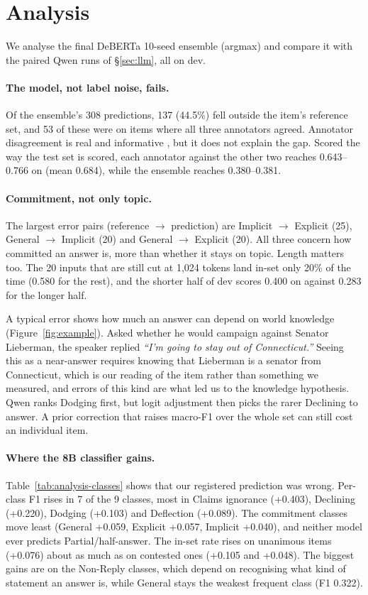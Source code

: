\section{Analysis}\label{sec:analysis}

We analyse the final DeBERTa 10-seed ensemble (argmax) and compare it with the paired
Qwen runs of \S\ref{sec:llm}, all on dev.

\paragraph{The model, not label noise, fails.}
Of the ensemble's 308 predictions, 137 (44.5\%) fell outside the item's reference set, and
53 of these were on items where all three annotators agreed. Annotator disagreement is real
and informative \citep{uma2021learning}, but it does not explain the gap. Scored the way
the test set is scored, each annotator against the other two reaches 0.643--0.766 on \Stwo{}
(mean 0.684), while the ensemble reaches 0.380--0.381.

\paragraph{Commitment, not only topic.}
The largest error pairs (reference $\rightarrow$ prediction) are Implicit $\rightarrow$
Explicit (25), General $\rightarrow$ Implicit (20) and General $\rightarrow$ Explicit (20).
All three concern how committed an answer is, more than whether it stays on topic. Length
matters too. The 20 inputs that are still cut at 1,024 tokens land in-set only 20\% of the
time (0.580 for the rest), and the shorter half of dev scores 0.400 on \Stwo{} against 0.283
for the longer half.

\FigureExample
A typical error shows how much an answer can depend on world knowledge
(Figure~\ref{fig:example}). Asked whether he would campaign against Senator Lieberman, the
speaker replied \emph{``I'm going to stay out of Connecticut.''} Seeing this as a near-answer
requires knowing that Lieberman is a senator from Connecticut, which is our reading of the
item rather than something we measured, and errors of this kind are what led us to the
knowledge hypothesis. Qwen ranks Dodging first, but logit adjustment then picks the rarer
Declining to answer. A prior correction that raises macro-F1 over the whole set can still
cost an individual item.

\paragraph{Where the 8B classifier gains.}
Table~\ref{tab:analysis-classes} shows that our registered prediction was wrong. Per-class
F1 rises in 7 of the 9 classes, most in Claims ignorance (+0.403), Declining (+0.220),
Dodging (+0.103) and Deflection (+0.089). The commitment classes move least (General +0.059,
Explicit +0.057, Implicit +0.040), and neither model ever predicts Partial/half-answer. The
in-set rate rises on unanimous items (+0.076) about as much as on contested ones (+0.105 and
+0.048). The biggest gains are on the Non-Reply classes, which depend on recognising what
kind of statement an answer is, while General stays the weakest frequent class (F1 0.322).

